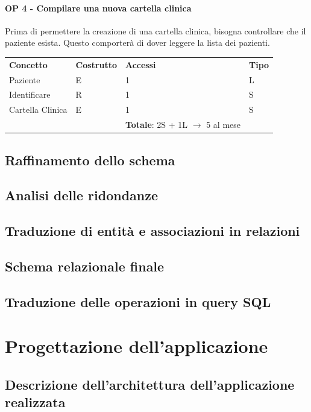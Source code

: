 \documentclass[a4paper, 12pt]{report}
\begin{document}
\subsubsection*{OP 4 - Compilare una nuova cartella clinica}
Prima di permettere la creazione di una cartella clinica, bisogna controllare che il paziente esista.
Questo comporterà di dover leggere la lista dei pazienti. \par
\bigskip
\noindent
\begin{tabularx}{\textwidth}{XlXl}
        \rowcolor{seaGreen}
        \textbf{Concetto} & \textbf{Costrutto} & \textbf{Accessi} & \textbf{Tipo} \\
        Paziente & E & 1 & L \\
        \hline
        Identificare & R & 1 & S \\
        \hline
        Cartella Clinica & E & 1 & S \\
        \rowcolor{seaGreen}
         &  & \textbf{Totale}: 2S + 1L $\rightarrow$ 5 al mese & \\
\end{tabularx}

\section{Raffinamento dello schema}

\section{Analisi delle ridondanze}

\section{Traduzione di entità e associazioni in relazioni}

\section{Schema relazionale finale}

\section{Traduzione delle operazioni in query SQL}

\chapter{Progettazione dell’applicazione}

\section{Descrizione dell’architettura dell’applicazione realizzata}
\end{document}
